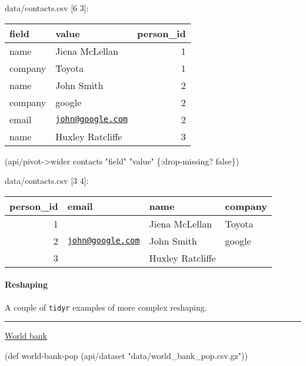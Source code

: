 \documentclass[]{article}
\newenvironment{Shaded}{\begin{snugshade}}{\end{snugshade}}
\newcommand{\StringTok}[1]{\textcolor[rgb]{0.31,0.60,0.02}{#1}}
\newcommand{\FunctionTok}[1]{\textcolor[rgb]{0.00,0.00,0.00}{#1}}
\newcommand{\VariableTok}[1]{\textcolor[rgb]{0.00,0.00,0.00}{#1}}
\newcommand{\BuiltInTok}[1]{#1}
\newcommand{\AttributeTok}[1]{\textcolor[rgb]{0.77,0.63,0.00}{#1}}
\newcommand{\NormalTok}[1]{#1}
\let\oldparagraph\paragraph
\renewcommand{\paragraph}[1]{\oldparagraph{#1}\mbox{}}
\begin{document}
data/contacts.csv {[}6 3{]}:

\begin{longtable}[]{@{}llr@{}}
\toprule
field & value & person\_id\tabularnewline
\midrule
\endhead
name & Jiena McLellan & 1\tabularnewline
company & Toyota & 1\tabularnewline
name & John Smith & 2\tabularnewline
company & google & 2\tabularnewline
email & \href{mailto:john@google.com}{\nolinkurl{john@google.com}} &
2\tabularnewline
name & Huxley Ratcliffe & 3\tabularnewline
\bottomrule
\end{longtable}

\begin{Shaded}
\begin{Highlighting}[]
\NormalTok{(api/pivot->wider contacts }\StringTok{"field"} \StringTok{"value"}\NormalTok{ \{}\AttributeTok{:drop-missing}\NormalTok{? }\VariableTok{false}\NormalTok{\})}
\end{Highlighting}
\end{Shaded}

data/contacts.csv {[}3 4{]}:

\begin{longtable}[]{@{}rlll@{}}
\toprule
person\_id & email & name & company\tabularnewline
\midrule
\endhead
1 & & Jiena McLellan & Toyota\tabularnewline
2 & \href{mailto:john@google.com}{\nolinkurl{john@google.com}} & John
Smith & google\tabularnewline
3 & & Huxley Ratcliffe &\tabularnewline
\bottomrule
\end{longtable}

\paragraph{Reshaping}\label{reshaping}

A couple of \texttt{tidyr} examples of more complex reshaping.

\begin{center}\rule{0.5\linewidth}{0.5pt}\end{center}

\href{https://tidyr.tidyverse.org/articles/pivot.html\#world-bank}{World
bank}

\begin{Shaded}
\begin{Highlighting}[]
\NormalTok{(}\BuiltInTok{def}\FunctionTok{ world-bank-pop }\NormalTok{(api/dataset }\StringTok{"data/world_bank_pop.csv.gz"}\NormalTok{))}
\end{Highlighting}
\end{Shaded}
\end{document}
